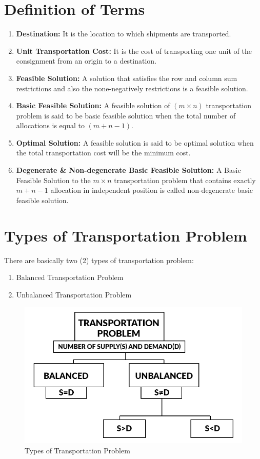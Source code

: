 \documentclass[12pt]{report}
\newcommand{\bt}[1]{\textbf{#1}}
\newcommand{\tp}{Transportation Problem }
\begin{document}
	\section{Definition of Terms}
	\begin{enumerate}
		\item \bt{Destination:} It is the location to which shipments are transported.
		\item \bt{Unit Transportation Cost:} It is the cost of transporting one unit of the consignment from an origin to a destination.
		\item \bt{Feasible Solution:} A solution that satisfies the row and column sum restrictions and also the none-negatively restrictions is a feasible solution.
		\item\bt{Basic Feasible Solution:} A feasible solution of $(m\times n)$ transportation problem is said to be basic feasible solution when the total number of allocations is equal to $(m+n-1)$.
		\item\bt{Optimal Solution:} A feasible solution is said to be optimal solution when the total transportation cost will be the minimum cost.
		\item\bt{Degenerate \& Non-degenerate Basic Feasible Solution:} A Basic Feasible Solution to the $m\times n$ transportation problem that contains exactly $m+n-1$ allocation in independent position is called non-degenerate basic feasible solution.
	\end{enumerate}
	
	
	\section{Types of Transportation Problem}
	There are basically two (2) types of transportation problem:
	\begin{enumerate}
		\item Balanced \tp\\[-1.1cm]
		\item Unbalanced \tp \\[-1.3cm]
	\end{enumerate}
	\begin{figure}[!h]
		\centering
		\includegraphics[width=0.51\linewidth]{tt4}
		\caption{Types of Transportation Problem}
		\label{fig:1_1}
	\end{figure}
	
\end{document}
